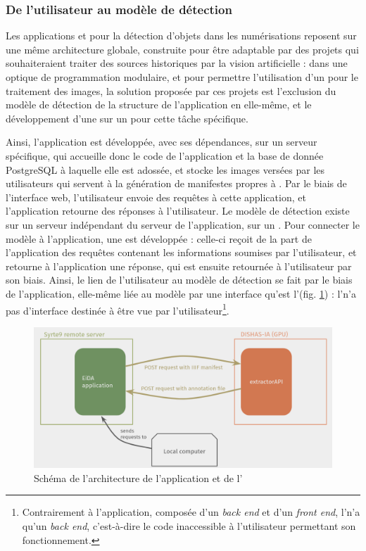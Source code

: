     \subsubsection{De l'utilisateur au modèle de détection}
	Les applications \vhs et \eida pour la détection d'objets dans les numérisations reposent sur une même architecture globale, construite pour être adaptable par des projets qui souhaiteraient traiter des sources historiques par la vision artificielle : dans une optique de programmation modulaire, et pour permettre l'utilisation d'un \gpu pour le traitement des images, la solution proposée par ces projets est l'exclusion du modèle de détection de la structure de l'application en elle-même, et le développement d'une \api sur un \gpu pour cette tâche spécifique.
	
	Ainsi, l'application est développée, avec ses dépendances, sur un serveur spécifique, qui accueille donc le code de l'application et la base de donnée PostgreSQL à laquelle elle est adossée, et stocke les images versées par les utilisateurs qui servent à la génération de manifestes \iiif propres à \eida. Par le biais de l'interface web, l'utilisateur envoie des requêtes à cette application, et l'application retourne des réponses à l'utilisateur. Le modèle de détection existe sur un serveur indépendant du serveur de l'application, sur un \gpu. Pour connecter le modèle à l'application, une \api est développée : celle-ci reçoit de la part de l'application \eida des requêtes contenant les informations soumises par l'utilisateur, et retourne à l'application une réponse, qui est ensuite retournée à l'utilisateur par son biais. Ainsi, le lien de l'utilisateur au modèle de détection se fait par le biais de l'application, elle-même liée au modèle par une interface qu'est l'\api (fig. \ref{fig:archi_eida}) : l'\api n'a pas d'interface destinée à être vue par l'utilisateur\footnote{Contrairement à l'application, composée d'un \textit{back end} et d'un \textit{front end}, l'\api n'a qu'un \textit{back end}, c'est-à-dire le code inaccessible à l'utilisateur permettant son fonctionnement.}.
	
	\begin{figure}[h]
		\centering
		\includegraphics[width=15cm]{images/schema_archi.png}
		\caption{Schéma de l'architecture de l'application \eida et de l'\api \exapi}
		\label{fig:archi_eida}
	\end{figure}

